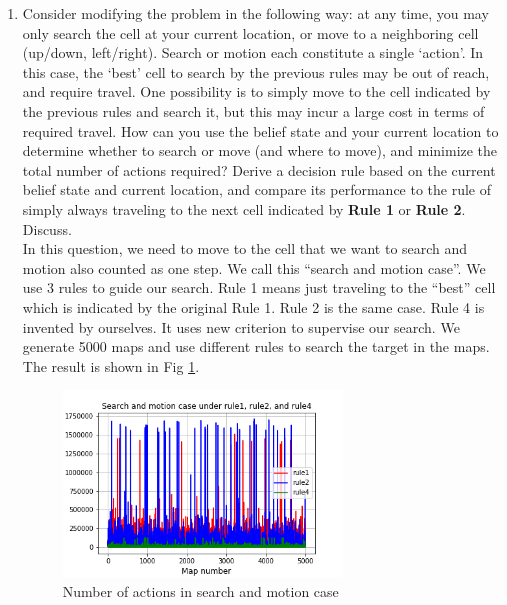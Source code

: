 \documentclass[letter]{article}
\begin{document}
\begin{enumerate}
	
	From the figure above, we can see that the performance of Rule 1 is the worst. Rule 2
	and Rule 3 are similar. The means of Rule1, Rule 2, and Rule 3 are 6287.49, 5223.53,
	and 5145.19. The average number of actions of Rule 3 is the smallest one among three
	rules. So, Rule 3 is the best. The variances of Rule1, Rule 2, and Rule 3 are
	54138591.92, 42819190.19, and 39314588.23. From this view, we can also conclude
	that Rule 3 is better. When the number of search actions is beyond 100000, we call it
	unsolvable because it is extremely hard to find the target under this circumstance. The
	fail rate of Rule1, Rule 2, and Rule 3 are 0.0026, 0.008, 0.0116. Rule 3 may sometimes
	not be able to find the target although it performs better.
	
	\item {Consider modifying the problem in the following way: at any time, you may only search the cell at your
		current location, or move to a neighboring cell (up/down, left/right). Search or motion each constitute a single
		`action'. In this case, the `best' cell to search by the previous rules may be out of reach, and require travel.
		One possibility is to simply move to the cell indicated by the previous rules and search it, but this may incur a
		large cost in terms of required travel. How can you use the belief state and your current location to determine
		whether to search or move (and where to move), and minimize the total number of actions required? Derive a
		decision rule based on the current belief state and current location, and compare its performance to the rule
		of simply always traveling to the next cell indicated by \textbf{Rule 1} or \textbf{Rule 2}. Discuss.} \\
	
	In this question, we need to move to the cell that we want to search and motion also
	counted as one step. We call this “search and motion case”. We use 3 rules to guide our
	search. Rule 1 means just traveling to the “best” cell which is indicated by the original
	Rule 1. Rule 2 is the same case. Rule 4 is invented by ourselves. It uses new criterion to
	supervise our search. We generate 5000 maps and use different rules to search the
	target in the maps. The result is shown in Fig \ref{fig:q4}.
	
	\begin{figure}[H]
		\centering
		\includegraphics[width=0.7\textwidth]{fig/part1-q4.png}
		\caption{Number of actions in search and motion case}
		\label{fig:q4}
	\end{figure}
	

\end{enumerate}
\end{document}
